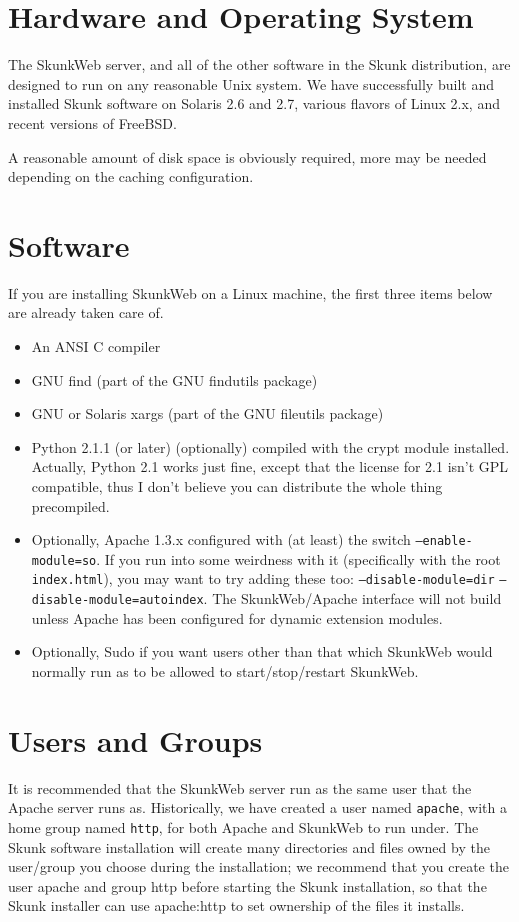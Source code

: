 \documentclass[titlepage]{manual}
\begin{document}
\section{Hardware and Operating System}
   The SkunkWeb server, and all of the other software in the Skunk
   distribution, are designed to run on any reasonable Unix system. We
   have successfully built and installed Skunk software on Solaris 2.6
   and 2.7, various flavors of Linux 2.x, and recent versions of
   FreeBSD.
   
   A reasonable amount of disk space is obviously required, more may
   be needed depending on the caching configuration.

\section{Software}
If you are installing SkunkWeb on a Linux machine, the first three
items below are already taken care of.

\begin{itemize}
\item An ANSI C compiler
\item GNU find (part of the GNU findutils package)
\item GNU or Solaris xargs (part of the GNU fileutils package)
\item Python 2.1.1 (or later) (optionally) compiled with the crypt
module installed.  Actually, Python 2.1 works just fine, except that
the license for 2.1 isn't GPL compatible, thus I don't believe you can
distribute the whole thing precompiled.

\item Optionally, Apache 1.3.x configured with (at least) the switch
\texttt{--enable-module=so}.  If you run into some weirdness with it
(specifically with the root \texttt{index.html}), you may want to try
adding these too: \texttt{--disable-module=dir}
\texttt{--disable-module=autoindex}.  The SkunkWeb/Apache interface
will not build unless Apache has been configured for dynamic extension
modules.

\item Optionally, Sudo if you want users other than that which
SkunkWeb would normally run as to be allowed to start/stop/restart
SkunkWeb.

\end{itemize}

\section{Users and Groups}
It is recommended that the SkunkWeb server run as the same user that
the Apache server runs as. Historically, we have created a user named
\texttt{apache}, with a home group named \texttt{http}, for both
Apache and SkunkWeb to run under. The Skunk software installation will
create many directories and files owned by the user/group you choose
during the installation; we recommend that you create the user apache
and group http before starting the Skunk installation, so that the
Skunk installer can use apache:http to set ownership of the files it
installs.
     
\end{document}
